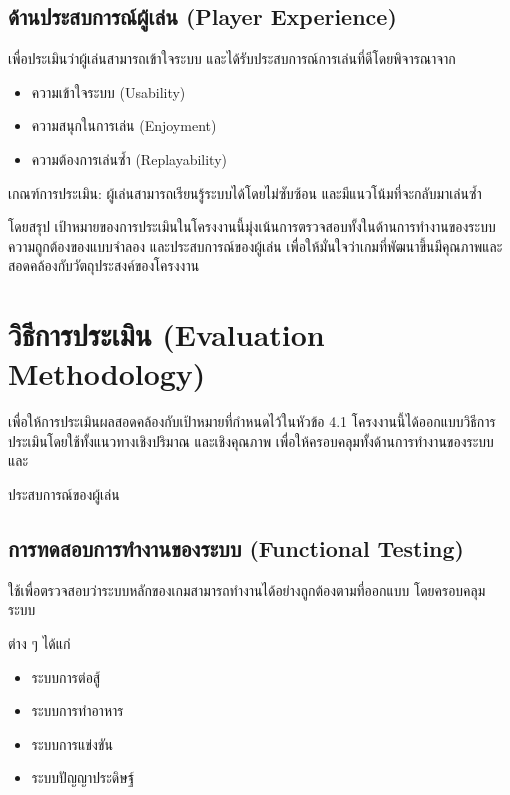 \subsection{ด้านประสบการณ์ผู้เล่น (Player Experience)}

เพื่อประเมินว่าผู้เล่นสามารถเข้าใจระบบ และได้รับประสบการณ์การเล่นที่ดีโดยพิจารณาจาก

\begin{itemize}
\item ความเข้าใจระบบ (Usability)
\item ความสนุกในการเล่น (Enjoyment)
\item ความต้องการเล่นซ้ำ (Replayability)
\end{itemize}

\par\vspace{0.5em}\noindent
เกณฑ์การประเมิน: ผู้เล่นสามารถเรียนรู้ระบบได้โดยไม่ซับซ้อน และมีแนวโน้มที่จะกลับมาเล่นซ้ำ

\par\vspace{0.5em}\noindent
โดยสรุป เป้าหมายของการประเมินในโครงงานนี้มุ่งเน้นการตรวจสอบทั้งในด้านการทำงานของระบบ ความถูกต้องของแบบจำลอง และประสบการณ์ของผู้เล่น เพื่อให้มั่นใจว่าเกมที่พัฒนาขึ้นมีคุณภาพและสอดคล้องกับวัตถุประสงค์ของโครงงาน

\section{วิธีการประเมิน (Evaluation Methodology)}

เพื่อให้การประเมินผลสอดคล้องกับเป้าหมายที่กำหนดไว้ในหัวข้อ 4.1 โครงงานนี้ได้ออกแบบวิธีการประเมินโดยใช้ทั้งแนวทางเชิงปริมาณ และเชิงคุณภาพ เพื่อให้ครอบคลุมทั้งด้านการทำงานของระบบและ
\par\vspace{0.5em}\noindent
ประสบการณ์ของผู้เล่น


\subsection{การทดสอบการทำงานของระบบ (Functional Testing)}

ใช้เพื่อตรวจสอบว่าระบบหลักของเกมสามารถทำงานได้อย่างถูกต้องตามที่ออกแบบ โดยครอบคลุมระบบ
\par\vspace{0.5em}\noindent
ต่าง ๆ ได้แก่

\begin{itemize}
\item ระบบการต่อสู้
\item ระบบการทำอาหาร
\item ระบบการแข่งขัน
\item ระบบปัญญาประดิษฐ์
\end{itemize}

